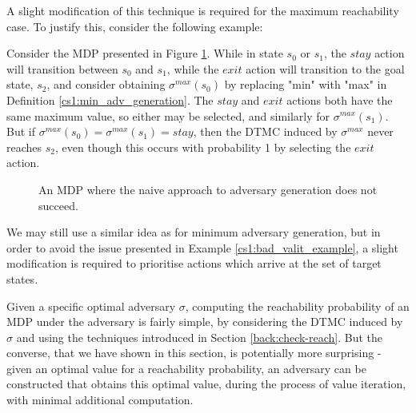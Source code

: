 A slight modification of this technique is required for the maximum reachability case. To justify this, consider the following example:

\begin{example}
\label{cs1:bad_valit_example}

Consider the MDP presented in Figure \ref{cs1:bad_mdp_figure}. While in state $s_0$ or $s_1$, the $stay$ action will transition between $s_0$ and $s_1$, while the $exit$ action will transition to the goal state, $s_2$, and consider obtaining $\sigma^{max}(s_0)$ by replacing "min" with "max" in Definition \ref{cs1:min_adv_generation}. The $stay$ and $exit$ actions both have the same maximum value, so either may be selected, and similarly for $\sigma^{max}(s_1)$. But if $\sigma^{max}(s_0) = \sigma^{max}(s_1) = stay$, then the DTMC induced by $\sigma^{max}$ never reaches $s_2$, even though this occurs with probability 1 by selecting the $exit$ action.
\begin{figure}

\centering
{}
\caption{An MDP where the naive approach to adversary generation does not succeed.}
\label{cs1:bad_mdp_figure}
\end{figure}
\end{example}

We may still use a similar idea as for minimum adversary generation, but in order to avoid the issue presented in Example \ref{cs1:bad_valit_example}, a slight modification is required to prioritise actions which arrive at the set of target states.

Given a specific optimal adversary $\sigma$, computing the reachability probability of an MDP under the adversary is fairly simple, by considering the DTMC induced by $\sigma$ and using the techniques introduced in Section \ref{back:check-reach}. But the converse, that we have shown in this section, is potentially more surprising - given an optimal value for a reachability probability, an adversary can be constructed that obtains this optimal value, during the process of value iteration, with minimal additional computation.


